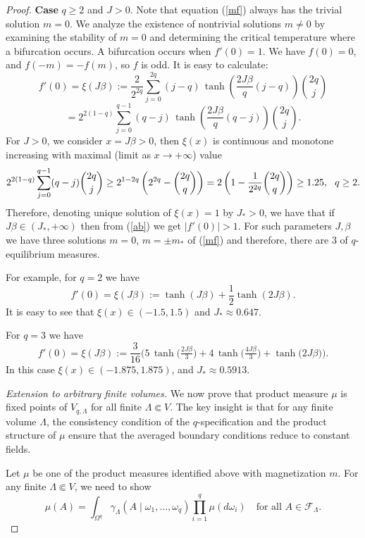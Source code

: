 \documentclass[10pt,a4paper]{amsart}
\begin{document}
\begin{proof}
{\bf Case} $ q \geq 2 $ and $J>0$. Note that  equation (\ref{mf}) always has the trivial solution $m=0$. We analyze the existence of nontrivial solutions $m\ne 0$ by examining the stability of $m=0$ and determining the critical temperature where a bifurcation occurs.
A bifurcation occurs when $f'(0)=1$.
We have $ f(0) = 0 $, and $ f(-m) = -f(m) $, so $ f $ is odd. It is easy to calculate:
$$
f'(0)=\xi(J\beta):= \frac{2}{2^{2q}} \sum_{j=0}^{2q} (j-q)\,
\tanh\!\left(\frac{2J\beta}{q}(j-q)\right)\binom{2q}{j}$$
\begin{equation}\label{ab}
=2^{2(1-q)} \sum_{j=0}^{q-1} (q-j)\,
\tanh\!\left(\frac{2J\beta}{q}(q-j)\right)\binom{2q}{j}.
\end{equation}
For $J>0$, we consider $x=J\beta>0$, then  $\xi(x)$ is continuous and monotone increasing with maximal (limit as $x\to +\infty$) value 
$$2^{2(1-q)} \sum_{j=0}^{q-1} (q-j)\binom{2q}{j}\geq 2^{1-2q} \left(2^{2q}-\binom{2q}{q}\right)=2\left(1-{1\over 2^{2q}}\binom{2q}{q}\right)\geq 1.25, \ \ q\geq 2.$$ Therefore, denoting unique solution of $\xi(x)=1$ by $J_*>0$, we have  that if $J\beta\in (J_*, +\infty)$ then from (\ref{ab}) we get $|f'(0)|>1$.  For such parameters $J, \beta$ we have three solutions $m=0$, $m=\pm m_*$ of (\ref{mf})  and therefore, there are 3 of $q$-equilibrium measures. 

For  example, for   $ q = 2 $ we have 
\begin{equation}\label{q2}
f'(0) =\xi(J\beta):= \tanh(J\beta) + \frac{1}{2} \tanh(2J\beta).
\end{equation}
It is easy to see that $\xi(x)\in (-1.5, 1.5)$ and 
$J_*\approx 0.647$.

For $q=3$ we have 
$$
f'(0)
= \xi(J\beta):=\frac{3}{16}\Bigg(5\,\tanh\!\Big(\tfrac{2J\beta}{3}\Big)
+ 4\,\tanh\!\Big(\tfrac{4J\beta}{3}\Big)
+ \tanh\!\big(2J\beta\big)\Bigg).
$$
In this case $\xi(x)\in (-1.875, 1.875)$, and 
$J_*\approx 0.5913$.

{\it  Extension to arbitrary finite volumes.}
We now prove that product measure $\mu$ is fixed points of $V_{q,\Lambda}$ for all finite $\Lambda \Subset V$. The key insight is that for any finite volume $\Lambda$, the consistency condition of the $q$-specification and the product structure of $\mu$ ensure that the averaged boundary conditions reduce to constant fields.

Let $\mu$ be one of the product measures identified above with magnetization $m$. For any finite $\Lambda \Subset V$, we need to show
$$
\mu(A) = \int_{\Omega^q} \gamma_\Lambda(A \mid \omega_1, \dots, \omega_q) \prod_{i=1}^q \mu(d\omega_i) \quad \text{for all } A \in \mathcal{F}_\Lambda.
$$


\end{proof}
\end{document}
